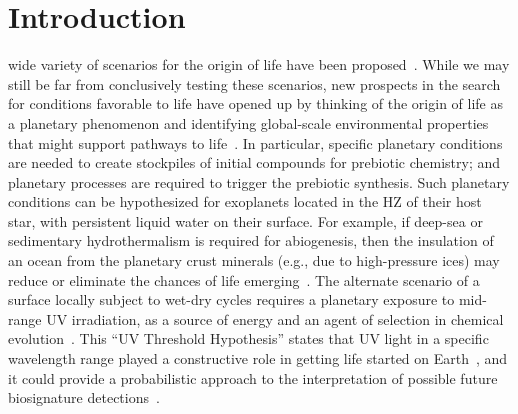 \documentclass[twocolumn,twocolappendix,linenumbers]{aastex631}
\begin{document}
\section{Introduction}
\label{sec:intro}
 wide variety of scenarios for the origin of life have been proposed~\citep[e.g.,][]{Baross1985,Brasier2011,Mulkidjanian2012,Fox2013,Deamer2015,Westall2018}.
While we may still be far from conclusively testing these scenarios, new prospects in the search for conditions favorable to life have opened up by thinking of the origin of life as a planetary phenomenon and identifying global-scale environmental properties that might support pathways to life~\citep{Sasselov2020}.
In particular, specific planetary conditions are needed to create stockpiles of initial compounds for prebiotic chemistry; and planetary processes are required to trigger the prebiotic synthesis.
Such planetary conditions can be hypothesized for exoplanets located in the \gls{HZ} of their host star, with persistent liquid water on their surface.
For example, if deep-sea or sedimentary hydrothermalism is required for abiogenesis, then the insulation of an ocean from the planetary crust minerals (e.g., due to high-pressure ices) may reduce or eliminate the chances of life emerging~\citep[e.g.,][]{Baross1985}.
The alternate scenario of a surface locally subject to wet-dry cycles requires a planetary exposure to mid-range \gls{UV} irradiation, as a source of energy and an agent of selection in chemical evolution~\citep[e.g.,][]{Deamer2019}.
This “UV Threshold Hypothesis” states that \gls{UV} light in a specific wavelength range played a constructive role in getting life started on Earth~\citep{Ranjan2016,Ranjan2017c,Rimmer2018,Rapf2016}, and it could provide a probabilistic approach to the interpretation of possible future biosignature detections~\citep[e.g.,][]{Catling2018,Walker2018}.
\end{document}
